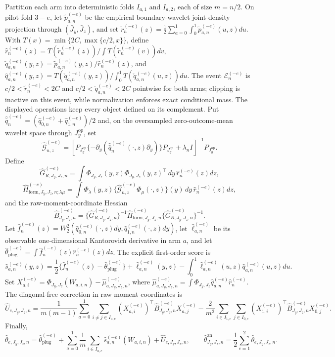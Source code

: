 Partition each arm into deterministic folds \(I_{a,1}\) and \(I_{a,2}\), each of size \(m=n/2\). On pilot fold \(3-e\), let \(\widetilde p_{a,n}^{(-e)}\) be the empirical boundary-wavelet joint-density projection through \((\bar J_y,\bar J_z)\), and set \(\widetilde r_n^{(-e)}(z)=\frac12\sum_{a=0}^1\int_0^1\widetilde p_{a,n}^{(-e)}(u,z)du\). With \(T(x)=\min\{2C,\max\{c/2,x\}\}\), define \(\widehat r_n^{(-e)}(z)=T(\widetilde r_n^{(-e)}(z))/\int T(\widetilde r_n^{(-e)}(v))dv\), \(\check q_{a,n}^{(-e)}(y,z)=\widetilde p_{a,n}^{(-e)}(y,z)/\widehat r_n^{(-e)}(z)\), and \(\widehat q_{a,n}^{(-e)}(y,z)=T(\check q_{a,n}^{(-e)}(y,z))/\int_0^1T(\check q_{a,n}^{(-e)}(u,z))du\). The event \(\mathcal E_n^{(-e)}\) is \(c/2<\widetilde r_n^{(-e)}<2C\) and \(c/2<\check q_{a,n}^{(-e)}<2C\) pointwise for both arms; clipping is inactive on this event, while normalization enforces exact conditional mass. The displayed operations keep every object defined on its complement. Put \(\widehat{\bar q}_n^{(-e)}=(\widehat q_{0,n}^{(-e)}+\widehat q_{1,n}^{(-e)})/2\) and, on the oversampled zero-outcome-mean wavelet space through \(J_y^{\mathrm{op}}\), set
\[
\widehat{\mathcal G}_{n,z}^{(-e)}=
\left[P_{J_y^{\mathrm{op}}}\{-\partial_y(\widehat{\bar q}_n^{(-e)}(\cdot,z)\partial_y)\}P_{J_y^{\mathrm{op}}}+\lambda_n I\right]^{-1}P_{J_y^{\mathrm{op}}}.
\]
Define
\[
\widehat G_{R,J_y,J_z,n}^{(-e)}
=\int\Phi_{J_y,J_z}(y,z)\Phi_{J_y,J_z}(y,z)^{\top}\,dy\,\widehat r_n^{(-e)}(z)dz,
\]
\[
\widehat H_{\mathrm{form},J_y,J_z,n;\lambda\mu}^{(-e)}
=\int\Phi_\lambda(y,z)\{\widehat{\mathcal G}_{n,z}^{(-e)}\Phi_\mu(\cdot,z)\}(y)\,dy\,\widehat r_n^{(-e)}(z)dz,
\]
and the raw-moment-coordinate Hessian
\[
\widehat B_{J_y,J_z,n}^{(-e)}
=\{\widehat G_{R,J_y,J_z,n}^{(-e)}\}^{-1}
\widehat H_{\mathrm{form},J_y,J_z,n}^{(-e)}
\{\widehat G_{R,J_y,J_z,n}^{(-e)}\}^{-1}.
\]
Let \(\widehat f_n^{(-e)}(z)=W_2^2(\widehat q_{0,n}^{(-e)}(\cdot,z)dy,\widehat q_{1,n}^{(-e)}(\cdot,z)dy)\), let \(\widehat\ell_{a,n}^{(-e)}\) be its observable one-dimensional Kantorovich derivative in arm \(a\), and let \(\widehat\theta_{\mathrm{plug}}^{(-e)}=\int\widehat f_n^{(-e)}(z)\widehat r_n^{(-e)}(z)dz\). The explicit first-order score is
\[
\widehat s_{a,n}^{(-e)}(y,z)=\frac12\{\widehat f_n^{(-e)}(z)-\widehat\theta_{\mathrm{plug}}^{(-e)}\}+\widehat\ell_{a,n}^{(-e)}(y,z)-\int_0^1\widehat\ell_{a,n}^{(-e)}(u,z)\widehat q_{a,n}^{(-e)}(u,z)du.
\]
Set \(X_{a,i}^{(-e)}=\Phi_{J_y,J_z}(W_{a,i,n})-\widehat\mu_{a,J_y,J_z,n}^{(-e)}\), where \(\widehat\mu_{a,J_y,J_z,n}^{(-e)}=\int\Phi_{J_y,J_z}\widehat q_{a,n}^{(-e)}\widehat r_n^{(-e)}\). The diagonal-free correction in raw moment coordinates is
\[
\widehat U_{e,J_y,J_z,n}=\frac{1}{m(m-1)}\sum_{a=0}^1\sum_{i\ne j\in I_{a,e}}(X_{a,i}^{(-e)})^\top\widehat B_{J_y,J_z,n}^{(-e)}X_{a,j}^{(-e)}-\frac{2}{m^2}\sum_{i\in I_{1,e}}\sum_{j\in I_{0,e}}(X_{1,i}^{(-e)})^\top\widehat B_{J_y,J_z,n}^{(-e)}X_{0,j}^{(-e)}.
\]
Finally,
\[
\widehat\theta_{e,J_y,J_z,n}=\widehat\theta_{\mathrm{plug}}^{(-e)}+\sum_{a=0}^1\frac1m\sum_{i\in I_{a,e}}\widehat s_{a,n}^{(-e)}(W_{a,i,n})+\widehat U_{e,J_y,J_z,n},
\qquad
\widehat\theta^{\mathrm{an}}_{J_y,J_z,n}=\frac12\sum_{e=1}^2\widehat\theta_{e,J_y,J_z,n}.
\]